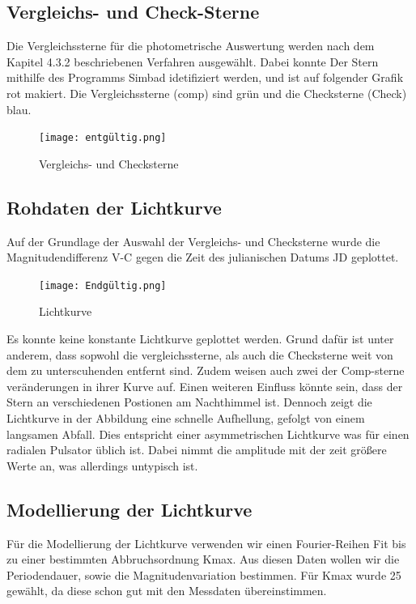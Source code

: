 \documentclass[ngerman,ruledheaders=section,class=report,thesis={type=Protokoll},accentcolor=1b,marginpar=false,parskip=half-,fontsize=11pt,]{tudapub}
\begin{document}
	\subsection{Vergleichs- und Check-Sterne}
	Die Vergleichssterne für die photometrische Auswertung werden nach dem Kapitel 4.3.2 beschriebenen Verfahren ausgewählt. Dabei konnte Der Stern mithilfe des Programms Simbad idetifiziert werden, und ist auf folgender Grafik rot makiert. Die Vergleichssterne (comp) sind grün und die Checksterne (Check) blau.
	
	\begin{figure}[h]
		\centering
		\texttt{[image: entgültig.png]}
		\caption{Vergleichs- und Checksterne}
		\label{Abbildung 4.43}
	\end{figure}
	
	



	\subsection{Rohdaten der Lichtkurve}
	Auf der Grundlage der Auswahl der Vergleichs- und Checksterne wurde die Magnitudendifferenz V-C gegen die Zeit des julianischen Datums JD geplottet.
	
	\begin{figure}[h]
		\centering
		\texttt{[image: Endgültig.png]}
		\caption{Lichtkurve}
		\label{Abbildung 4.44}
	\end{figure}

	Es konnte keine konstante Lichtkurve geplottet werden. Grund dafür ist unter anderem, dass sopwohl die vergleichssterne, als auch die Checksterne weit von dem zu unterscuhenden entfernt sind. Zudem weisen auch zwei der Comp-sterne veränderungen in ihrer Kurve auf. Einen weiteren Einfluss könnte sein, dass der Stern an verschiedenen Postionen am Nachthimmel ist.
Dennoch zeigt die Lichtkurve in der Abbildung eine schnelle Aufhellung, gefolgt von einem langsamen Abfall. Dies entspricht einer asymmetrischen Lichtkurve was für einen radialen Pulsator üblich ist. Dabei nimmt die amplitude mit der zeit größere Werte an, was allerdings untypisch ist.

	\subsection{Modellierung der Lichtkurve}
	Für die Modellierung der Lichtkurve verwenden wir einen Fourier-Reihen Fit bis zu einer bestimmten Abbruchsordnung Kmax. Aus diesen Daten wollen wir die Periodendauer, sowie die Magnitudenvariation bestimmen.
	Für Kmax wurde 25 gewählt, da diese schon gut mit den Messdaten übereinstimmen.
\end{document}
